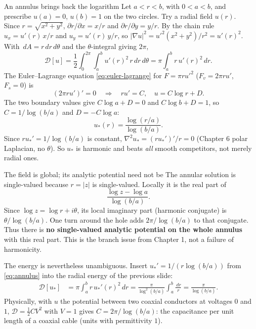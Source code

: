 \documentclass[11pt]{beamer}
\newcommand{\dd}{\,d}
\newcommand{\D}{\mathcal D}
\begin{document}
\begin{frame}{An annulus brings back the logarithm}
\small
Let $a<r<b$, with $0<a<b$, and prescribe $u(a)=0$, $u(b)=1$ on the two circles.
Try a radial field \(u(r)\). Since \(r=\sqrt{x^2+y^2}\), \(\partial r/\partial x=x/r\) and \(\partial r/\partial y=y/r\). By the
chain rule \(u_x=u'(r)\,x/r\) and \(u_y=u'(r)\,y/r\), so \(|\nabla u|^2=u'^2(x^2+y^2)/r^2=u'(r)^2\). With
\(\dd A=r\dd r\dd\theta\) and the \(\theta\)-integral giving \(2\pi\),
\[
 \D[u]=\frac12\int_0^{2\pi}\!\!\int_a^b u'(r)^2\,r\dd r\dd\theta
 =\pi\int_a^b r\,u'(r)^2\dd r.
\]
The Euler--Lagrange equation \eqref{eq:euler-lagrange} for $F=\pi r u'^2$
($F_v=2\pi ru'$, $F_s=0$) is
\[
 (2\pi r u')'=0\quad\Longrightarrow\quad
 ru'=C,\quad u=C\log r+D.
\]
The two boundary values give $C\log a+D=0$ and $C\log b+D=1$, so
$C=1/\log(b/a)$ and $D=-C\log a$:
\begin{equation}
 u_*(r)=\frac{\log(r/a)}{\log(b/a)}.\label{eq:annulus}
\end{equation}
Since $ru_*'=1/\log(b/a)$ is constant, $\nabla^2 u_*=(ru_*')'/r=0$ (Chapter 6 polar Laplacian,
no $\theta$). So $u_*$ is harmonic and beats \emph{all} smooth competitors, not merely radial ones.
\end{frame}

\begin{frame}{The field is global; its analytic potential need not be}
\small
The annular solution is single-valued because $r=|z|$ is single-valued.
Locally it is the real part of
\[
 \frac{\log z-\log a}{\log(b/a)}.
\]
Since $\log z=\log r+i\theta$, its local imaginary part (harmonic conjugate) is $\theta/\log(b/a)$. One turn around the hole
adds $2\pi/\log(b/a)$ to that conjugate.
Thus there is \textbf{no single-valued analytic potential on the whole annulus}
with this real part. This is the branch issue from Chapter 1, not a failure of harmonicity.

\medskip
The energy is nevertheless unambiguous. Insert $u_*'=1/(r\log(b/a))$ from
\eqref{eq:annulus} into the radial energy of the previous slide:
\begin{align*}
 \D[u_*]
 &=\pi\int_a^b r\,u_*'(r)^2\dd r
 =\frac{\pi}{\log^2(b/a)}\int_a^b\frac{\dd r}{r}
 =\frac{\pi}{\log(b/a)}.
\end{align*}
Physically, with $u$ the potential between two coaxial conductors at voltages $0$ and $1$,
$\D=\tfrac12CV^2$ with $V=1$ gives $C=2\pi/\log(b/a)$: the capacitance per unit length of a
coaxial cable (units with permittivity $1$).
\end{frame}
\end{document}
